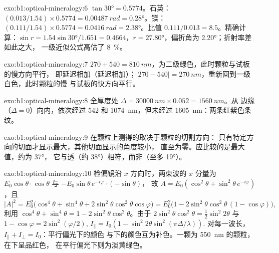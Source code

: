 \begin{solution}{exo:b1:optical-mineralogy:6}
$\tan\ang{30} = 0.5774$。石英：$(0.013/1.54)\times0.5774 = \qty{0.00487}{rad}
= \ang{0.28}$。镁：$(0.111/1.54)\times0.5774 = \qty{0.0416}{rad} =
\ang{2.38}$。比值 $0.111/0.013 = 8.5$。精确计算：$\sin r = 1.54\sin\ang{30}/1.651
= 0.4664$，$r = \ang{27.80}$，偏折角为 \ang{2.20}；折射率差如此之大，
一级近似公式高估了 \qty{8}{\percent}。
\end{solution}

\begin{solution}{exo:b1:optical-mineralogy:7}
$270 + 540 = \qty{810}{nm}$，为二级绿色，此时颗粒与试板的慢方向平行，
即延迟相加（延迟相加）；$|270 - 540| =
\qty{270}{nm}$，重新回到一级白色，此时颗粒的慢
与试板的快方向平行。
\end{solution}

\begin{solution}{exo:b1:optical-mineralogy:8}
全厚度处 $\Delta = \qty{30000}{nm}\times0.052 = \qty{1560}{nm}$。从
边缘（$\Delta = 0$）向内，依次经过 542 和
\qty{1074}{nm}，但未经过 \qty{1605}{nm}：两条红紫色条纹。
\end{solution}

\begin{solution}{exo:b1:optical-mineralogy:9}
在颗粒上测得的取决于颗粒的切割方向：
只有特定方向的切面才显示最大，其他切面显示的角度较小，
直至为零。应比较的是最大值，约为 \ang{37}，
它与透（约 \ang{38}）相符，而非（至多
\ang{19}）。
\end{solution}

\begin{solution}{exo:b1:optical-mineralogy:10}
检偏镜沿 $x$ 方向时，两束波的 $x$ 分量为
$E_0\cos\theta\cdot\cos\theta$ 与 $-E_0\sin\theta\,e^{-i\varphi}\cdot(-\sin\theta)$，
故 $A = E_0(\cos^2\theta + \sin^2\theta\,e^{-i\varphi})$，且
\[
  |A|^2 = E_0^2\bigl(\cos^4\theta + \sin^4\theta + 2\sin^2\theta\cos^2\theta\cos\varphi\bigr)
  = E_0^2\bigl(1 - 2\sin^2\theta\cos^2\theta\,(1 - \cos\varphi)\bigr),
\]
利用 $\cos^4\theta + \sin^4\theta = 1 - 2\sin^2\theta\cos^2\theta$。由于
$2\sin^2\theta\cos^2\theta = \frac12\sin^2 2\theta$ 与 $1 - \cos\varphi =
2\sin^2(\varphi/2)$, $I_\parallel = I_0(1 - \sin^2 2\theta\sin^2(\pi\Delta/\lambda))$.
对每一波长，$I_\parallel + I_\perp = I_0$：平行偏光下的颜色
与下的颜色互为补色。一颗为
\qty{550}{nm} 的颗粒，在下呈品红色，
在平行偏光下则为淡黄绿色。
\end{solution}

